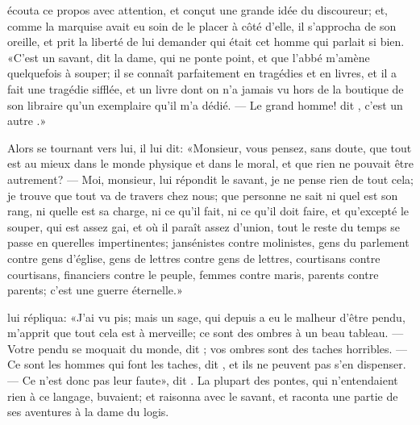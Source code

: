  écouta ce propos avec attention, et conçut une grande idée du
discoureur; et, comme la marquise avait eu soin de le placer à côté
d’elle, il s’approcha de son oreille, et prit la liberté de lui
demander qui était cet homme qui parlait si bien. «C’est un savant, dit
la dame, qui ne ponte point, et que l’abbé m’amène quelquefois à
souper; il se connaît parfaitement en tragédies et en livres, et il a
fait une tragédie sifflée, et un livre dont on n’a jamais vu hors de la
boutique de son libraire qu’un exemplaire qu’il m’a dédié. — Le grand
homme! dit , c’est un autre .»

Alors se tournant vers lui, il lui dit: «Monsieur, vous pensez, sans
doute, que tout est au mieux dans le monde physique et dans le moral,
et que rien ne pouvait être autrement? — Moi, monsieur, lui répondit le
savant, je ne pense rien de tout cela; je trouve que tout va de travers
chez nous; que personne ne sait ni quel est son rang, ni quelle est sa
charge, ni ce qu’il fait, ni ce qu’il doit faire, et qu’excepté le
souper, qui est assez gai, et où il paraît assez d’union, tout le reste
du temps se passe en querelles impertinentes; jansénistes contre
molinistes, gens du parlement contre gens d’église, gens de lettres
contre gens de lettres, courtisans contre courtisans, financiers contre
le peuple, femmes contre maris, parents contre parents; c’est une
guerre éternelle.»


 lui répliqua: «J’ai vu pis; mais un sage, qui depuis a eu le
malheur d’être pendu, m’apprit que tout cela est à merveille; ce sont
des ombres à un beau tableau. — Votre pendu se moquait du monde, dit
; vos ombres sont des taches horribles. — Ce sont les hommes qui
font les taches, dit , et ils ne peuvent pas s’en dispenser. — Ce
n’est donc pas leur faute», dit . La plupart des pontes, qui
n’entendaient rien à ce langage, buvaient; et  raisonna avec le
savant, et  raconta une partie de ses aventures à la dame du
logis.

